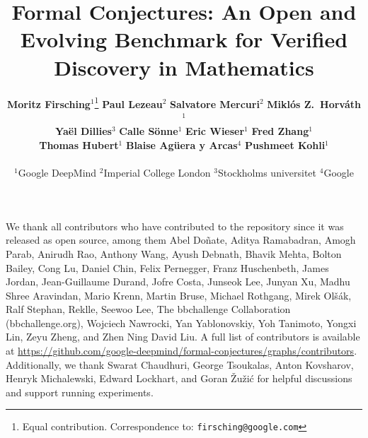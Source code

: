 \documentclass{article}
\title{Formal Conjectures: An Open and Evolving Benchmark for Verified Discovery in Mathematics}
\author{%
  \textbf{Moritz Firsching}$^1$\thanks{Equal contribution. Correspondence to: \texttt{firsching@google.com}} \quad
  \textbf{Paul Lezeau}$^2$\footnotemark[1] \quad
  \textbf{Salvatore Mercuri}$^2$\footnotemark[1] \quad
  \textbf{Mikl\'{o}s Z.~Horv\'{a}th}$^1$\footnotemark[1] \\
  \textbf{Ya\"{e}l Dillies}$^3$ \quad
  \textbf{Calle S\"{o}nne}$^1$ \quad
  \textbf{Eric Wieser}$^1$ \quad
  \textbf{Fred Zhang}$^1$ \\
  \textbf{Thomas Hubert}$^1$ \quad
  \textbf{Blaise Ag\"{u}era y Arcas}$^4$ \quad
  \textbf{Pushmeet Kohli}$^1$ \\
  \vspace{0.1cm} \\
  $^1$Google DeepMind \quad $^2$Imperial College London \quad
  $^3$Stockholms universitet \quad $^4$Google
}
\begin{document}
\maketitle



















\begin{ack}
We thank all contributors who have contributed to the repository since it was released as open source, among them
Abel Do\~{n}ate,
Aditya Ramabadran,
Amogh Parab,
Anirudh Rao,
Anthony Wang,
Ayush Debnath,
Bhavik Mehta,
Bolton Bailey,
Cong Lu,
Daniel Chin,
Felix Pernegger,
Franz Huschenbeth,
James Jordan,
Jean-Guillaume Durand,
Jofre Costa,
Junseok Lee,
Junyan Xu,
Madhu Shree Aravindan,
Mario Krenn,
Martin Bruse,
Michael Rothgang,
Mirek Ol\v{s}\'{a}k,
Ralf Stephan,
Reklle,
Seewoo Lee,
The bbchallenge Collaboration (bbchallenge.org),
Wojciech Nawrocki,
Yan Yablonovskiy,
Yoh Tanimoto,
Yongxi Lin,
Zeyu Zheng,
and Zhen Ning David Liu.
A full list of contributors is available at \url{https://github.com/google-deepmind/formal-conjectures/graphs/contributors}.
Additionally, we thank Swarat Chaudhuri, George Tsoukalas, Anton Kovsharov, Henryk Michalewski, Edward Lockhart, and Goran Žužić for helpful discussions and support running experiments.
\end{ack}





\appendix


\end{document}
